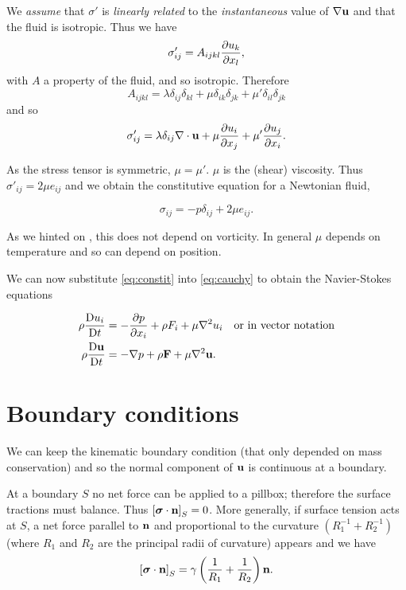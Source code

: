 \documentclass{notes}
\newcommand{\bs}{\boldsymbol{\sigma}}
\theoremstyle{plain}
\begin{document}
We \emph{assume} that $\sigma'$ is \emph{linearly related} to the
\emph{instantaneous} value of $\nabla \mathbf{u}$ and that the fluid is
isotropic.  Thus we have
\[
\sigma'_{i j} = A_{i j k l} \frac{\partial u_k}{\partial x_l},
\]
with $A$ a property of the fluid, and so isotropic.  Therefore
\[
A_{i j k l} = \lambda \delta_{i j} \delta_{k l}
+ \mu \delta_{i k} \delta_{j k} + \mu' \delta_{i l} \delta_{j k}
\]
and so
\[
\sigma'_{i j} = \lambda \delta_{i j} \nabla \cdot \mathbf{u}
+ \mu \frac{\partial u_i}{\partial x_j} + \mu' \frac{\partial u_j}{\partial x_i}.
\]

As the stress tensor is symmetric, $\mu = \mu'$.  $\mu$ is the
(shear) viscosity.  Thus ${\sigma'_{i j} = 2 \mu e_{i j}}$ and we obtain
the constitutive equation for a Newtonian fluid,

\begin{equation}\label{eq:constit}
\sigma_{i j} = - p \delta_{i j} + 2 \mu e_{i j}.
\end{equation}

As we hinted on , this does not depend on
vorticity.  In general $\mu$ depends on temperature and so can depend
on position.

We can now substitute \eqref{eq:constit} into \eqref{eq:cauchy} to
obtain the Navier-Stokes equations

\begin{equation}\label{eq:ns}
\begin{split}
\rho \frac{\mathrm{D} u_i}{\mathrm{D} t} &= - \frac{\partial p}{\partial x_i} + \rho F_i + \mu \nabla^2 u_i \quad \text{or
in vector notation} \\
\rho \frac{\mathrm{D}\mathbf{u}}{\mathrm{D} t} & = - \nabla p + \rho \mathbf{F} + \mu \nabla^2 \mathbf{u}.
\end{split}
\end{equation}

\section{Boundary conditions}

We can keep the kinematic boundary condition (that only depended on
mass conservation) and so the normal component of $\mathbf{u}$ is continuous at
a boundary.

At a boundary $S$ no net force can be applied to a pillbox; therefore
the surface tractions must balance.  Thus $\left[ \bs \cdot \vn
\right]_S = 0$.  More generally, if surface tension acts at $S$, a net
force parallel to $\mathbf{n}$ and proportional to the curvature $\left(
  R_1^{-1} + R_2^{-1} \right)$ (where $R_1$ and $R_2$ are the
principal radii of curvature) appears and we have
\[
\left[\bs \cdot \vn \right]_S = \gamma \left( \frac{1}{R_1}
+ \frac{1}{R_2} \right) \vn.
\]
\end{document}
